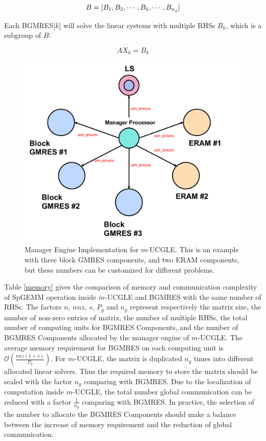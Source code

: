 \begin{equation}
B = [B_1, B_2, \cdots, B_k, \cdots, B_{n_g}] ~\\
\end{equation}

Each BGMRES[$k$] will solve the linear systems with multiple RHSs $B_k$, which is a subgroup of $B$:

\begin{equation}
\label{eq_sub}
AX_k = B_k
\end{equation}

\begin{figure}[htbp]
	\centering
	\includegraphics[width=4.8in]{fig/ucmgle.pdf}
	\caption{Manager Engine Implementation for $m$-UCGLE. This is an example with three block GMRES components, and two ERAM components, but these numbers can be customized for different problems.}
	\label{fig:ucmgle}
\end{figure}

Table \ref{memory} gives the comparison of memory and communication complexity of SpGEMM operation inside $m$-UCGLE and BGMRES with the same number of RHSs. The factors $n$, $nnz$, $s$, $P_g$ and $n_g$ represent respectively the matrix size, the number of non-zero entries of matrix, the number of multiple RHSs, the total number of computing units for BGMRES Components, and the number of BGMRES Components allocated by the manager engine of $m$-UCGLE. The average memory requirement for BGMRES on each computing unit is $\mathcal{O}(\frac{nnz(1+s)}{P_{g}})$. For $m$-UCGLE, the matrix is duplicated $n_g$ times into different allocated linear solvers. Thus the required memory to store the matrix should be scaled with the factor $n_g$ comparing with BGMRES. Due to the localization of computation inside $m$-UCGLE, the total number global communication can be reduced with a factor $\frac{1}{n_g}$ comparing with BGMRES. In practice, the selection of the number to allocate the BGMRES Components should make a balance between the increase of memory requirement and the reduction of global communication.

